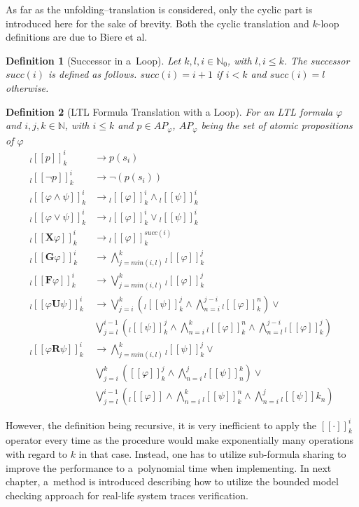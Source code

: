 \documentclass[12pt,twoside,draft]{fithesis}
\newcommand{\mNatural}{\mathbb{N}}
\newcommand{\bF}{\mathbf{F}}
\newcommand{\bG}{\mathbf{G}}
\newcommand{\bX}{\mathbf{X}}
\newcommand{\bU}{\mathbf{U}}
\newcommand{\bR}{\mathbf{R}}
\newtheorem{mydef}{Definition}
\begin{document}
As far as the unfolding--translation is considered, only the cyclic part
is introduced here for the sake of brevity.
Both the cyclic translation and $k$-loop definitions are due to Biere
et al.
\begin{mydef}[Successor in a~Loop]
Let $k,l,i\in\mNatural_0$, with $l,i \leq k$. The successor $succ(i)$ is
defined as follows. $succ(i)=i+1$ if $i<k$ and $succ(i)=l$ otherwise.
\end{mydef}
\begin{mydef}[LTL Formula Translation with a Loop]
For an LTL formula $\varphi$ and $i,j,k\in\mNatural$, with $i\leq k$ and
$p\in {AP}_\varphi$, ${AP}_\varphi$ being the set of atomic propositions
of $\varphi$
\begin{align}
	{}_l[[p]]_k^i&\rightarrow p(s_i)\\
	{}_l[[\neg p]]_k^i&\rightarrow\neg(p(s_i))\\
	{}_l[[\varphi\wedge\psi]]_k^i&\rightarrow
		{}_l[[\varphi]]_k^i\wedge{}_l[[\psi]]_k^i\\
	{}_l[[\varphi\vee\psi]]_k^i&\rightarrow
		{}_l[[\varphi]]_k^i\vee{}_l[[\psi]]_k^i\\
	{}_l[[\bX\varphi]]_k^i&\rightarrow{}_l[[\varphi]]_k^{succ(i)}\\
	{}_l[[\bG\varphi]]_k^i&\rightarrow\bigwedge_{j=min(i,l)}^k
		{}_l[[\varphi]]_k^j\\
	{}_l[[\bF\varphi]]_k^i&\rightarrow\bigvee_{j=min(i,l)}^k
		{}_l[[\varphi]]_k^j\\
	{}_l[[\varphi\bU\psi]]_k^i&\rightarrow\bigvee_{j=i}^k\left(
		{}_l[[\psi]]_k^j\wedge\bigwedge_{n=i}^{j-i}{}_l[[\varphi]]_k^n
		\right)\vee\nonumber\\
		&\bigvee_{j=l}^{i-1}\left({}_l[[\psi]]_k^j\wedge\bigwedge_{n=i}^k
		{}_l[[\varphi]]_k^n\wedge\bigwedge_{n=l}^{j-i}
		{}_l[[\varphi]]_k^j\right)\\
	{}_l[[\varphi\bR\psi]]_k^i&\rightarrow\bigwedge_{j=min(i,l)}^k
		{}_l[[\psi]]_k^j\vee\nonumber\\
		&\bigvee_{j=i}^k\left([[\varphi]]_k^j\wedge\bigwedge_{n=i}^j
		{}_l[[\psi]]_n^k\right)\vee\nonumber\\
		&\bigvee_{j=l}^{i-1}\left({}_l[[\varphi]]\wedge\bigwedge_{n=i}^k
		{}_l[[\psi]]_k^n\wedge\bigwedge_{n=i}^j{}_l[[\psi]]k_n\right)
\end{align} 
\end{mydef}
However, the definition being recursive, it is very inefficient to
apply the $[[\cdot]]_k^i$ operator every time as the procedure would
make exponentially many operations with regard to $k$ in that case.
Instead, one has to utilize sub-formula sharing to improve the
performance to a~polynomial time when implementing\cite{biere}. In next
chapter, a~method is introduced describing how to utilize the bounded
model checking approach for real-life system traces verification.
\end{document}

